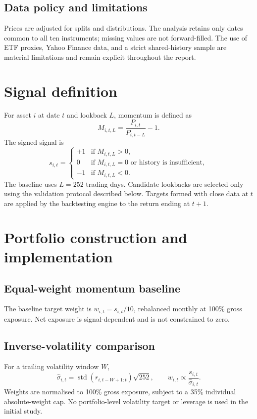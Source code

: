 \documentclass[11pt,a4paper]{article}
\begin{document}
\subsection{Data policy and limitations}
Prices are adjusted for splits and distributions. The analysis retains only dates common to all ten instruments; missing values are not forward-filled. The use of ETF proxies, Yahoo Finance data, and a strict shared-history sample are material limitations and remain explicit throughout the report.

\FloatBarrier

\section{Signal definition}
For asset $i$ at date $t$ and lookback $L$, momentum is defined as
\[
M_{i,t,L}=\frac{P_{i,t}}{P_{i,t-L}}-1.
\]
The signed signal is
\[
s_{i,t}=
\begin{cases}
  +1 & \text{if } M_{i,t,L}>0,\\
  0 & \text{if } M_{i,t,L}=0 \text{ or history is insufficient},\\
  -1 & \text{if } M_{i,t,L}<0.
\end{cases}
\]
The baseline uses $L=252$ trading days. Candidate lookbacks are selected only using the validation protocol described below. Targets formed with close data at $t$ are applied by the backtesting engine to the return ending at $t+1$.

\section{Portfolio construction and implementation}
\subsection{Equal-weight momentum baseline}
The baseline target weight is $w_{i,t}=s_{i,t}/10$, rebalanced monthly at 100\% gross exposure. Net exposure is signal-dependent and is not constrained to zero.

\subsection{Inverse-volatility comparison}
For a trailing volatility window $W$,
\[
\hat{\sigma}_{i,t}=\operatorname{std}(r_{i,t-W+1:t})\sqrt{252}, \qquad
w_{i,t}\propto\frac{s_{i,t}}{\hat{\sigma}_{i,t}}.
\]
Weights are normalised to 100\% gross exposure, subject to a 35\% individual absolute-weight cap. No portfolio-level volatility target or leverage is used in the initial study.
\end{document}

